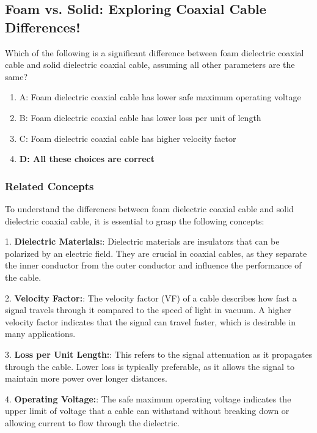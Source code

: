 \subsection{Foam vs. Solid: Exploring Coaxial Cable Differences!}

\begin{tcolorbox}[colback=gray!10, colframe=black, title=E9F08] Which of the following is a significant difference between foam dielectric coaxial cable and solid dielectric coaxial cable, assuming all other parameters are the same? 
\begin{enumerate}[label=\Alph*)]
    \item A: Foam dielectric coaxial cable has lower safe maximum operating voltage
    \item B: Foam dielectric coaxial cable has lower loss per unit of length
    \item C: Foam dielectric coaxial cable has higher velocity factor
    \item \textbf{D: All these choices are correct}
\end{enumerate} \end{tcolorbox}

\subsubsection{Related Concepts}

To understand the differences between foam dielectric coaxial cable and solid dielectric coaxial cable, it is essential to grasp the following concepts:

1. \textbf{Dielectric Materials:}: Dielectric materials are insulators that can be polarized by an electric field. They are crucial in coaxial cables, as they separate the inner conductor from the outer conductor and influence the performance of the cable.

2. \textbf{Velocity Factor:}: The velocity factor (VF) of a cable describes how fast a signal travels through it compared to the speed of light in vacuum. A higher velocity factor indicates that the signal can travel faster, which is desirable in many applications.

3. \textbf{Loss per Unit Length:}: This refers to the signal attenuation as it propagates through the cable. Lower loss is typically preferable, as it allows the signal to maintain more power over longer distances.

4. \textbf{Operating Voltage:}: The safe maximum operating voltage indicates the upper limit of voltage that a cable can withstand without breaking down or allowing current to flow through the dielectric.

